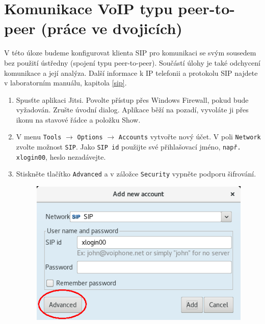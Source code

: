 \documentclass[a4paper,11pt]{article}
\begin{document}
\section{Komunikace VoIP typu peer-to-peer (práce ve dvojicích)}
V této úloze budeme konfigurovat klienta SIP pro komunikaci se svým sousedem bez použití ústředny (spojení typu peer-to-peer). Součástí úlohy je také odchycení komunikace a její analýza. Další informace k IP telefonii a protokolu SIP najdete v laboratorním manuálu, kapitola \ref{sip}. 
\begin{enumerate}
  \item Spusťte aplikaci Jitsi.
    Povolte přístup přes Windows Firewall, pokud bude vyžadován. Zrušte úvodní dialog. Aplikace běží na pozadí, vyvoláte ji přes ikonu na stavové řádce a položku Show. 
    \item V menu {\tt Tools} $\rightarrow$ {\tt Options} $\rightarrow$ {\tt Accounts} vytvořte nový účet. V poli {\tt Network} zvolte možnost {\tt SIP}. Jako {\tt SIP id} použijte své přihlašovací jméno, {\tt např. xlogin00}, heslo nezadávejte.
    \item Stiskněte tlačítko {\tt Advanced} a v záložce {\tt Security} vypněte podporu šifrování.
    \begin{figure}[h]
    	\centering
    	\includegraphics[scale=0.45]{img/account_p2p-b.png}
    \end{figure}


\end{enumerate}
\end{document}
